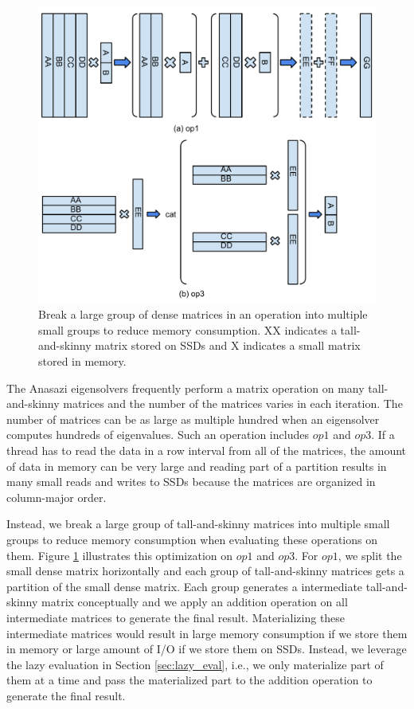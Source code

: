 \begin{figure}
\centering
\includegraphics[scale=0.4]{./mat_group.pdf}
\vspace{-5pt}
\caption{Break a large group of dense matrices in an operation into multiple
small groups to reduce memory consumption. XX indicates a tall-and-skinny matrix
stored on SSDs and X indicates a small matrix stored in memory.}
\vspace{-5pt}
\label{fig:mat_group}
\end{figure}

The Anasazi eigensolvers frequently perform a matrix operation on many
tall-and-skinny matrices and the number of the matrices varies in each iteration.
The number of matrices can be as large as multiple hundred when an eigensolver
computes hundreds of eigenvalues.
Such an operation includes $op1$ and $op3$. If a thread has to read the data
in a row interval from all of the matrices, the amount of data in memory
can be very large and reading part of a partition results in many small reads
and writes to SSDs because the matrices are organized in column-major order.

Instead, we break a large group of tall-and-skinny matrices into multiple small
groups to reduce
memory consumption when evaluating these operations on them. Figure
\ref{fig:mat_group} illustrates this optimization on $op1$ and $op3$. For $op1$,
we split the small dense matrix horizontally and each group of tall-and-skinny
matrices gets a partition of the small dense matrix. Each group generates
a intermediate tall-and-skinny matrix conceptually and we apply an addition
operation on all intermediate matrices to generate the final result.
Materializing these
intermediate matrices would result in large memory consumption if we store them
in memory or large amount of I/O if we store them on SSDs. Instead, we leverage
the lazy evaluation in Section \ref{sec:lazy_eval}, i.e., we only materialize
part of them at a time and pass the materialized part to the addition operation
to generate the final result.

